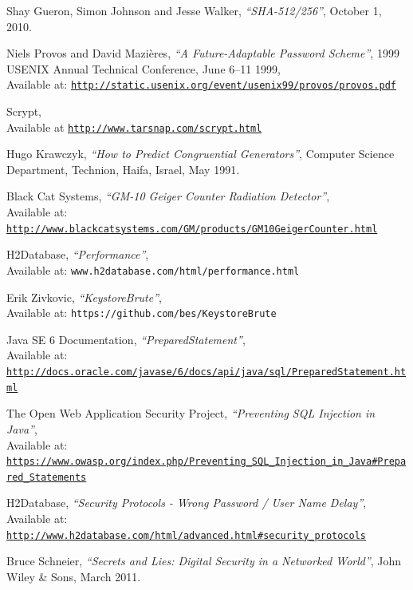 \documentclass[12pt, titlepage]{article}
\begin{document}
\begin{thebibliography}{10}
Shay Gueron, Simon Johnson and Jesse Walker, \emph{``SHA-512/256''}, October 1, 2010.

Niels Provos and David Mazières, \emph{``A Future-Adaptable Password Scheme''}, 1999 USENIX Annual Technical Conference, June 6–11 1999,
\\ Available at: \texttt{\url{http://static.usenix.org/event/usenix99/provos/provos.pdf}}

Scrypt,
\\ Available at \texttt{\url{http://www.tarsnap.com/scrypt.html}}

Hugo Krawczyk, \emph{``How to Predict Congruential Generators''}, Computer Science Department, Technion, Haifa, Israel, May 1991. 

Black Cat Systems, \emph{``GM-10 Geiger Counter Radiation Detector''},
\\ Available at: \texttt{\url{http://www.blackcatsystems.com/GM/products/GM10GeigerCounter.html}}

H2Database, \emph{``Performance''},
\\ Available at: \texttt{www.h2database.com/html/performance.html}

Erik Zivkovic, \emph{``KeystoreBrute''},
\\ Available at: \texttt{https://github.com/bes/KeystoreBrute}

Java SE 6 Documentation, \emph{``PreparedStatement''},
\\ Available at: \texttt{\url{http://docs.oracle.com/javase/6/docs/api/java/sql/PreparedStatement.html}}

The Open Web Application Security Project, \emph{``Preventing SQL Injection in Java''},
\\ Available at: \texttt{\url{https://www.owasp.org/index.php/Preventing\_SQL\_Injection\_in\_Java\#Prepared\_Statements}}

H2Database, \emph{``Security Protocols - Wrong Password / User Name Delay''},
\\ Available at: \texttt{\url{http://www.h2database.com/html/advanced.html\#security\_protocols}}

Bruce Schneier, \emph{``Secrets and Lies: Digital Security in a Networked World''},  John Wiley \& Sons, March 2011.

\end{thebibliography}
\end{document}
